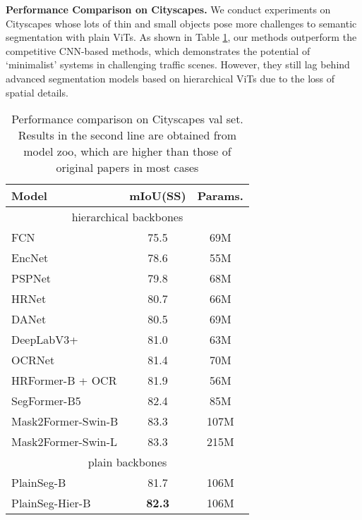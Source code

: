 \documentclass{article} \usepackage{iclr2024_conference,times}
\begin{document}
\textbf{Performance Comparison on Cityscapes.} We conduct experiments on Cityscapes whose lots of thin and small objects pose more challenges to semantic segmentation with plain ViTs. As shown in Table \ref{tab:11}, our methods outperform the competitive CNN-based methods, which demonstrates the potential of `minimalist' systems in challenging traffic scenes. However, they still lag behind advanced segmentation models based on hierarchical ViTs due to the loss of spatial details.

\begin{table}[h]
\caption{Performance comparison on Cityscapes val set. Results in the second line are obtained from  model zoo, which are higher than those of original papers in most cases}
\begin{center}
\label{tab:11}
\begin{tabular}{l|cc}
\toprule
Model                                     & mIoU(SS)                    & Params.     \\ \midrule
\multicolumn{3}{c}{hierarchical backbones} \\ \midrule
FCN\cite{long2015fully}                   & 75.5                       & 69M       \\
EncNet\cite{zhang2018context}             & 78.6                        & 55M       \\
PSPNet\cite{zhao2017pyramid}              & 79.8                       & 68M       \\
HRNet\cite{wang2020deep}                  & 80.7                       & 66M       \\
DANet\cite{fu2019dual}                    & 80.5                     & 69M       \\
DeepLabV3+\cite{chen2018encoder}          & 81.0                      & 63M       \\
OCRNet\cite{yuan2020object}               & 81.4                     & 70M       \\ \midrule
HRFormer-B + OCR\cite{yuan2021hrformer}   & 81.9                       & 56M           \\
SegFormer-B5\cite{xie2021segformer}       & 82.4                      & 85M       \\
Mask2Former-Swin-B\cite{cheng2022masked}  & 83.3                      & 107M    \\
Mask2Former-Swin-L\cite{cheng2022masked}  & 83.3                      & 215M\\ \midrule
\multicolumn{3}{c}{plain backbones} \\ \midrule
PlainSeg-B                                & 81.7  & 106M \\
PlainSeg-Hier-B                                & \textbf{82.3}  & 106M \\ \bottomrule
\end{tabular}
\end{center}
\end{table}
\end{document}
